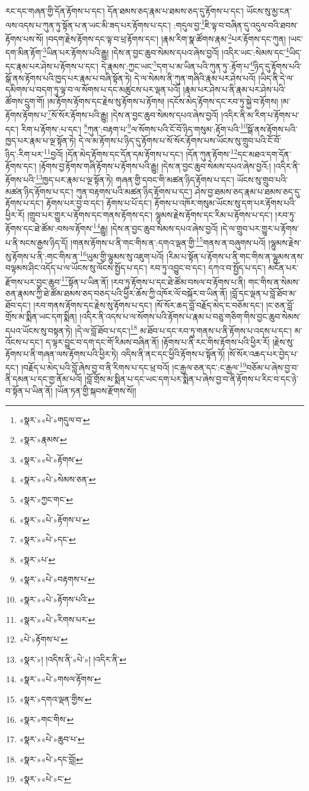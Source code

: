རང་དང་གཞན་གྱི་དོན་རྟོགས་པ་དང་། དོན་ཐམས་ཅད་རྣམ་པ་ཐམས་ཅད་དུ་རྟོགས་པ་དང་། ཡོངས་སུ་མྱ་ངན་ལས་འདས་པ་ཀུན་ཏུ་སྟོན་པ་ན་ཡང་མི་ཟད་པར་རྟོགས་པ་དང་། :གདུལ་བྱ་\footnote{«སྣར་»«པེ་»གདུལ་བ་}ཇི་ལྟ་བ་བཞིན་དུ་འདུལ་བའི་ཐབས་རྟོགས་པས་སོ། །བདག་རྗེས་རྟོགས་དང་ལྟ་བ་ཕྲ་རྟོགས་དང་། །རྣམ་རིག་སྣ་ཚོགས་རྣམ་\footnote{«སྣར་»རྣམས་}པར་རྟོགས་དང་ཀུན། །ཡང་དག་མིན་རྟོག་\footnote{«སྣར་»«པེ་»རྟོགས་}ཡིན་པར་རྟོགས་པའི་རྒྱུ། །དེས་ན་བྱང་ཆུབ་སེམས་དཔའ་ཞེས་བྱའོ། །འདིར་ཡང་:སེམས་དང་\footnote{«སྣར་»«པེ་»སེམས་ཅན་}ཡིད་དང་རྣམ་པར་ཤེས་པ་རྟོགས་པ་དང་། དེ་རྣམས་:ཀྱང་ཡང་\footnote{«སྣར་»ཀྱང་གང་}དག་པ་མ་ཡིན་པའི་ཀུན་ཏུ་:རྟོག་པ་\footnote{«སྣར་»«པེ་»རྟོགས་པ་}ཉིད་དུ་རྟོགས་པའི་སྒོ་ནས་རྟོགས་པའི་ཁྱད་པར་རྣམ་པ་བཞི་སྟོན་ཏེ། དེ་ལ་སེམས་ནི་ཀུན་གཞིའི་རྣམ་པར་ཤེས་པའོ། །ཡིད་ནི་དེ་ལ་དམིགས་པ་བདག་ཏུ་ལྟ་བ་ལ་སོགས་པ་དང་མཚུངས་པར་ལྡན་པའོ། །རྣམ་པར་ཤེས་པ་ནི་རྣམ་པར་ཤེས་པའི་ཚོགས་དྲུག་གོ། །མ་རྟོགས་རྟོགས་དང་རྗེས་སུ་རྟོགས་པ་རྟོགས། །དངོས་མེད་རྟོགས་དང་རབ་ཏུ་སྐྱེ་བ་རྟོགས། །མ་རྟོགས་རྟོགས་པ་\footnote{«སྣར་»«པེ་»དང་}སོ་སོར་རྟོགས་པའི་རྒྱུ། །དེས་ན་བྱང་ཆུབ་སེམས་དཔའ་ཞེས་བྱའོ། །འདིར་ནི་མ་རིག་པ་རྟོགས་པ་དང་། རིག་པ་རྟོགས་:པ་དང་། \footnote{«སྣར་»པ་}ཀུན་:བརྟག་པ་\footnote{«སྣར་»«པེ་»བརྟགས་པ་}ལ་སོགས་པའི་ངོ་བོ་ཉིད་གསུམ་:རྟོག་པའི་\footnote{«སྣར་»«པེ་»རྟོགས་པའི་}སྒོ་ནས་རྟོགས་པའི་ཁྱད་པར་རྣམ་པ་ལྔ་སྟོན་ཏེ། དེ་ལ་མ་རྟོགས་པ་ཉིད་དུ་རྟོགས་པ་སོ་སོར་རྟོགས་པས་ཡོངས་སུ་གྲུབ་པའི་ངོ་བོ་ཉིད་:རིག་པར་\footnote{«སྣར་»«པེ་»རིགས་པར་}བྱའོ། །དོན་མེད་རྟོགས་དང་དོན་དམ་རྟོགས་པ་དང་། །དོན་ཀུན་རྟོགས་\footnote{«པེ་»རྟོགས་པ་}དང་མཐའ་དག་དོན་རྟོགས་དང་། །རྟོགས་བྱ་རྟོགས་གཞི་རྟོགས་པ་རྟོགས་པའི་རྒྱུ། །དེས་ན་བྱང་ཆུབ་སེམས་དཔའ་ཞེས་བྱའོ:། །འདིར་ནི་རྟོགས་པའི་\footnote{«སྣར་»། །འདིས་ནི་«པེ་»། །འདིར་ནི་}ཁྱད་པར་རྣམ་པ་ལྔ་སྟོན་ཏེ། གཞན་གྱི་དབང་གི་མཚན་ཉིད་རྟོགས་པ་དང་། ཡོངས་སུ་གྲུབ་པའི་མཚན་ཉིད་རྟོགས་པ་དང་། ཀུན་བརྟགས་པའི་མཚན་ཉིད་རྟོགས་པ་དང་། ཤེས་བྱ་ཐམས་ཅད་རྣམ་པ་ཐམས་ཅད་དུ་རྟོགས་པ་དང་། རྟོགས་པར་བྱ་བ་དང་། རྟོགས་པ་པོ་དང་། རྟོགས་པ་འཁོར་གསུམ་ཡོངས་སུ་དག་པར་རྟོགས་པའི་ཕྱིར་རོ། །གྲུབ་པར་གྱུར་པ་རྟོགས་དང་གནས་རྟོགས་དང་། ལྷུམས་རྗེས་རྟོགས་དང་རིམ་པ་རྟོགས་པ་དང་། །རབ་ཏུ་རྟོགས་དང་ཐེ་ཚོམ་:བསལ་རྟོགས་\footnote{«སྣར་»«པེ་»གསལ་རྟོགས་}རྒྱུ། །དེས་ན་བྱང་ཆུབ་སེམས་དཔའ་ཞེས་བྱའོ། །དེ་ལ་གྲུབ་པར་གྱུར་པ་རྟོགས་པ་ནི་སངས་རྒྱས་ཉིད་དོ། །གནས་རྟོགས་པ་ནི་གང་གིས་ན་:དགའ་ལྡན་གྱི་\footnote{«སྣར་»དགའ་ལྡན་གྱིས་}གནས་ན་བཞུགས་པའོ། །ལྷུམས་རྗེས་སུ་རྟོགས་པ་ནི་:གང་གིས་ན་\footnote{«སྣར་»གང་གིས་}ཡུམ་གྱི་ལྷུམས་སུ་འཇུག་པའོ། །རིམ་པ་སྟོན་པ་རྟོགས་པ་ནི་གང་གིས་ན་ལྷུམས་ནས་བལྟམས་ཤིང་འདོད་པ་ལ་ཡོངས་སུ་ལོངས་སྤྱོད་པ་དང་། རབ་ཏུ་འབྱུང་བ་དང་། དཀའ་བ་སྤྱོད་པ་དང་། མངོན་པར་རྫོགས་པར་བྱང་ཆུབ་\footnote{«སྣར་»«པེ་»ཆུབ་པ་}སྟོན་པ་ཡིན་ནོ། །རབ་ཏུ་རྟོགས་པ་དང་ཐེ་ཚོམ་བསལ་བ་རྟོགས་པ་ནི། གང་གིས་ན་སེམས་ཅན་རྣམས་ཀྱི་ཐེ་ཚོམ་ཐམས་ཅད་བཅད་པའི་ཕྱིར་ཆོས་ཀྱི་འཁོར་ལོ་བསྐོར་བ་ཡིན་ནོ། །བློ་དང་ལྡན་པ་བློ་ཐོབ་མ་ཐོབ་དང་། །རབ་གནས་རྟོགས་དང་རྗེས་སུ་རྟོགས་པ་དང་། །སོ་སོར་ཆད་བློ་བརྗོད་མེད་ང་བཅོམ་དང་། །ང་ཅན་བློ་གྲོས་མ་སྨིན་ཡང་དག་སྨིན། །འདིར་ནི་འདས་པ་ལ་སོགས་པའི་རྟོགས་པ་རྣམ་པ་བཅུ་གཅིག་གིས་བྱང་ཆུབ་སེམས་དཔའ་ཡོངས་སུ་བསྟན་ཏེ། །དེ་ལ་བློ་ཐོབ་པ་དང་།\footnote{«སྣར་»«པེ་»དང་བློ།} མ་ཐོབ་པ་དང་རབ་ཏུ་གནས་པ་ནི་རྟོགས་པ་འདས་པ་དང་། མ་འོངས་པ་དང་། ད་ལྟར་བྱུང་བ་དག་དང་གོ་རིམས་བཞིན་ནོ། །རྟོགས་པ་ནི་རང་གིས་རྟོགས་པའི་ཕྱིར་རོ། །རྗེས་སུ་རྟོགས་པ་ནི་གཞན་ལས་རྟོགས་པའི་ཕྱིར་ཏེ། འདིས་ནི་ནང་དང་ཕྱིའི་རྟོགས་པ་སྟོན་ཏོ། །སོ་སོར་འཆད་པར་བྱེད་པ་དང་། །བརྗོད་པ་མེད་པའི་བློ་ཞེས་བྱ་བ་ནི་རིགས་པ་དང་ཕྲ་བའོ། །ང་རྒྱལ་ཅན་དང་:ང་རྒྱལ་\footnote{«སྣར་»«པེ་»ང་}བཅོམ་པ་ཞེས་བྱ་བ་ནི་དམན་པ་དང་གྱ་ནོམ་པའོ། །བློ་གྲོས་མ་སྨིན་པ་དང་ཡང་དག་པར་སྨིན་པ་ཞེས་བྱ་བ་ནི་རྟོགས་པ་རིང་བ་དང་ཉེ་བ་སྟོན་པ་ཡིན་ནོ། །ཡོན་ཏན་གྱི་སྐབས་རྫོགས་སོ།། 